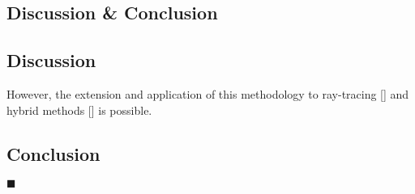 \begin{refsection}
\chapter{Discussion \& Conclusion}
\label{sec:conclusion}

\section{Discussion}
However, the extension and application of this methodology to ray-tracing [\cite{SanchezdelRio2011}] and hybrid methods [\cite{Shi2014}] is possible. 

\section{Conclusion}


$\blacksquare$
\printbibliography[heading=subbibliography]
\end{refsection}